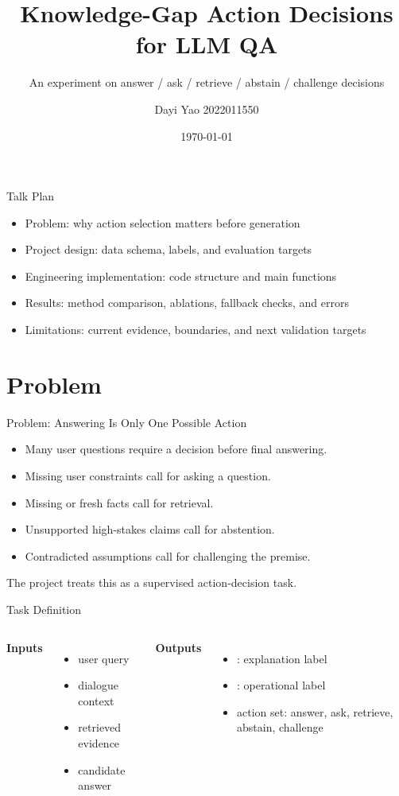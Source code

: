 \documentclass[aspectratio=169,10pt]{beamer}
\title{Knowledge-Gap Action Decisions for LLM QA}
\subtitle{An experiment on answer / ask / retrieve / abstain / challenge decisions}
\author{Dayi Yao 2022011550}
\institute{Tsinghua University}
\date{\today}
\newcommand{\code}[1]{\texttt{\small\detokenize{#1}}}
\begin{document}
\begin{frame}
  \titlepage
\end{frame}

\begin{frame}{Talk Plan}
  \begin{itemize}
    \item Problem: why action selection matters before generation
    \item Project design: data schema, labels, and evaluation targets
    \item Engineering implementation: code structure and main functions
    \item Results: method comparison, ablations, fallback checks, and errors
    \item Limitations: current evidence, boundaries, and next validation targets
  \end{itemize}
\end{frame}

\section{Problem}

\begin{frame}{Problem: Answering Is Only One Possible Action}
  \begin{itemize}
    \item Many user questions require a decision before final answering.
    \item Missing user constraints call for \alert{asking a question}.
    \item Missing or fresh facts call for \alert{retrieval}.
    \item Unsupported high-stakes claims call for \alert{abstention}.
    \item Contradicted assumptions call for \alert{challenging the premise}.
  \end{itemize}
  \vspace{4mm}
  \Large The project treats this as a supervised action-decision task.
\end{frame}

\begin{frame}{Task Definition}
  \begin{columns}[T,onlytextwidth]
    \textbf{Inputs}
    \begin{itemize}
      \item user query
      \item dialogue context
      \item retrieved evidence
      \item candidate answer
    \end{itemize}
    \textbf{Outputs}
    \begin{itemize}
      \item \code{gap_type}: explanation label
      \item \code{gold_action}: operational label
      \item action set: answer, ask, retrieve, abstain, challenge
    \end{itemize}
  \end{columns}
\end{frame}
\end{document}
